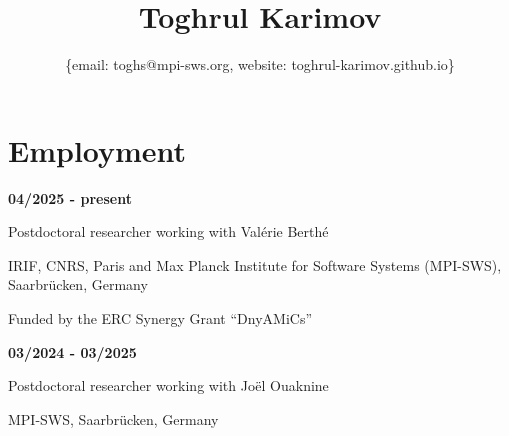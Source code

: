 \documentclass{article}
\title{\bfseries\Huge Toghrul Karimov}
\author{\{email: toghs@mpi-sws.org, website: toghrul-karimov.github.io\}}
\date{}
\begin{document}
	\maketitle
		
	\section*{Employment}
	\begin{minipage}{0.3\textwidth}
		\hspace{0.1cm} \textbf{04/2025 - present}
	\end{minipage}
	\vspace*{0.25cm}
	\begin{minipage}{0.7\textwidth}
		Postdoctoral researcher working with Val\'erie Berth\'e 
		
		\vspace*{0.2cm}
		
		IRIF, CNRS, Paris and Max Planck Institute for Software Systems (MPI-SWS), Saarbr\"ucken, Germany
		
		\vspace*{0.2cm}
			
		Funded by the ERC Synergy Grant ``DnyAMiCs''
		\vspace{0.3cm}
	\end{minipage}
	\vspace{0.85cm}
	\begin{minipage}{0.3\textwidth}
		\hspace{0.1cm} \textbf{03/2024 - 03/2025}
	\end{minipage}
	\begin{minipage}{0.7\textwidth}
		Postdoctoral researcher working with Jo\"el Ouaknine
		
		\vspace*{0.2cm}
		MPI-SWS, Saarbr\"ucken, Germany
	\end{minipage}
	
\end{document}
